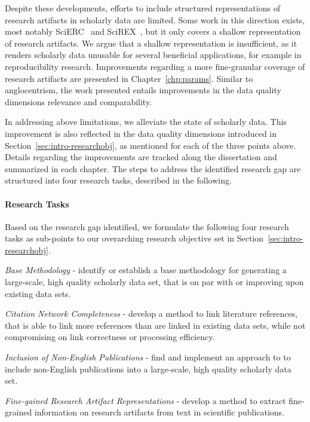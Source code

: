 \begin{enumerate}
Despite these developments, efforts to include structured representations of research artifacts in scholarly data are limited. Some work in this direction exists, most notably SciERC~\cite{luan2018scierc} and SciREX~\cite{Jain2020scirex}, but it only covers a shallow representation of research artifacts.
We argue that a shallow representation is insufficient, as it renders scholarly data unusable for several beneficial applications, for example in reproducibility research.
Improvements regarding a more fine-granular coverage of research artifacts are presented in Chapter~\ref{chp:params}. Similar to anglocentrism, the work presented entails improvements in the data quality dimensions relevance and comparability.
\end{enumerate}

In addressing above limitations, we alleviate the state of scholarly data. This improvement is also reflected in the data quality dimensions introduced in Section~\ref{sec:intro-researchobj}, as mentioned for each of the three points above. Details regarding the improvements are tracked along the dissertation and summarized in each chapter. The steps to address the identified research gap are structured into four research tasks, described in the following.

\paragraph{Research Tasks}
Based on the research gap identified, we formulate the following four research tasks as sub-points to our overarching research objective set in Section~\ref{sec:intro-researchobj}.

\begin{rtlist}
    \item \textit{Base Methodology} - identify or establish a base methodology for generating a large-scale, high quality scholarly data set, that is on par with or improving upon existing data sets.
    \item \textit{Citation Network Completeness} - develop a method to link literature references, that is able to link more references than are linked in existing data sets, while not compromising on link correctness or processing efficiency.
    \item \textit{Inclusion of Non-English Publications} - find and implement an approach to to include non-English publications into a large-scale, high quality scholarly data set.
    \item \textit{Fine-gained Research Artifact Representations} - develop a method to extract fine-grained information on research artifacts from text in scientific publications.
\end{rtlist}

